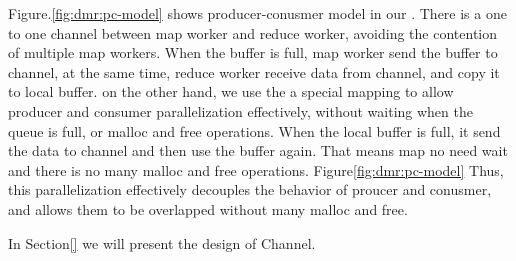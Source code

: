Figure.\ref{fig:dmr:pc-model} shows producer-conusmer model in our \myds.  
There is a one to one channel between map worker and reduce worker, 
avoiding the contention of multiple map workers.
When the buffer is full, map worker send the buffer to channel, 
at the same time, 
reduce worker receive data from channel, and copy it to local buffer.
on the other hand,
we use the a special mapping to allow producer and consumer parallelization effectively, 
without waiting when the queue is full, or malloc and free operations.
When the local buffer is full,
it send the data to channel and then use the buffer again.
That means map no need wait and there is no many malloc and free operations.
Figure\ref{fig:dmr:pc-model}
Thus, this parallelization effectively decouples the behavior of proucer and conusmer, and allows them to be overlapped 
without many malloc and free.

In Section\ref{} we will present the design of Channel.




%





